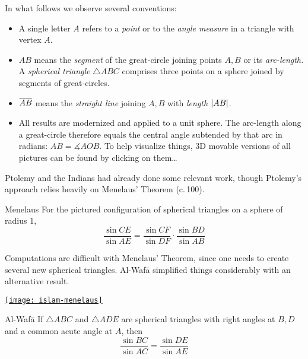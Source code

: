 
In what follows we observe several conventions:
\begin{itemize}\itemsep0pt
  \item A single letter $A$ refers to a \emph{point} or to the \emph{angle measure} in a triangle with vertex $A$.
  \item $AB$ means the \emph{segment} of the great-circle joining points $A,B$ or its \emph{arc-length.} A \emph{spherical triangle} $\triangle ABC$ comprises three points on a sphere joined by segments of great-circles.
  \item $\overline{AB}$ means the \emph{straight line} joining $A,B$ with \emph{length} $\left| AB\right|$.
  \item All results are modernized and applied to a unit sphere. The arc-length along a great-circle therefore equals the central angle subtended by that arc in radians: $AB=\measuredangle AOB$. To help visualize things, 3D movable versions of all pictures can be found by clicking on them\ldots 
\end{itemize}

\begin{minipage}[t]{0.75\linewidth}\vspace{-5pt}
Ptolemy and the Indians had already done some relevant work, though Ptolemy's approach relies heavily on Menelaus' Theorem (c.\,100\AD).

\begin{thm*}{Menelaus}{}
For the pictured configuration of spherical triangles on a sphere of radius 1,
\[\frac{\sin CE}{\sin AE}=\frac{\sin CF}{\sin DF}\cdot\frac{\sin BD}{\sin AB}\]
\end{thm*}

Computations are difficult with Menelaus' Theorem, since one needs to create several new spherical triangles. Al-Wafā simplified things considerably with an alternative result.
\end{minipage}\hfill\begin{minipage}[t]{0.24\linewidth}\vspace{-5pt}
\flushright\href{http://math.uci.edu/~ndonalds/math184/islam-menelaus.html}{\texttt{[image: islam-menelaus]}}
\end{minipage}
\medbreak




\begin{thm*}{Al-Wafā}{}
If $\triangle ABC$ and $\triangle ADE$ are spherical triangles with right angles at $B,D$ and a common acute angle at $A$, then
\[\frac{\sin BC}{\sin AC}=\frac{\sin DE}{\sin AE}\]
\end{thm*}

